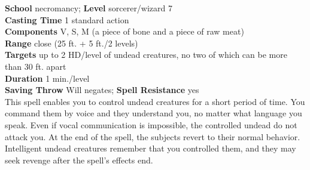 \textbf{School} necromancy; \textbf{Level} sorcerer/wizard 7\\
\textbf{Casting Time} 1 standard action\\
\textbf{Components} V, S, M (a piece of bone and a piece of raw meat)\\
\textbf{Range} close (25 ft. + 5 ft./2 levels)\\
\textbf{Targets} up to 2 HD/level of undead creatures, no two of which can be more than 30 ft. apart\\
\textbf{Duration} 1 min./level\\
\textbf{Saving Throw }Will negates; \textbf{Spell Resistance} yes\\
This spell enables you to control undead creatures for a short period of time. You command them by voice and they understand you, no matter what language you speak. Even if vocal communication is impossible, the controlled undead do not attack you. At the end of the spell, the subjects revert to their normal behavior.\\
Intelligent undead creatures remember that you controlled them, and they may seek revenge after the spell's effects end.\\
